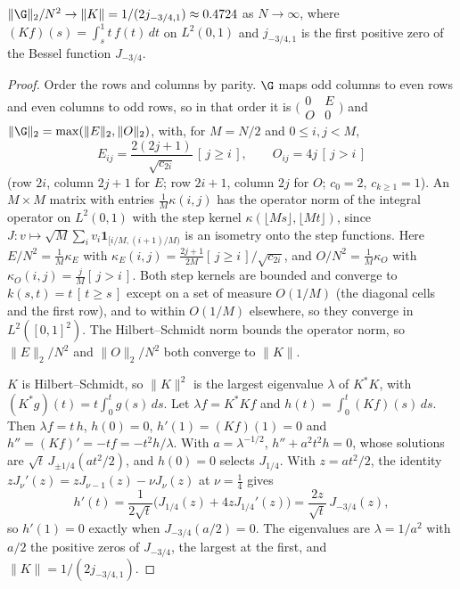 \begin{theorem}
\label{thm:G-limit}
$\|\G\|_2/N^2\to\|K\|=1/(2j_{-3/4,1})\approx0.4724$ as $N\to\infty$, where $(Kf)(s)=\int_s^1t\,f(t)\,dt$ on $L^2(0,1)$ and $j_{-3/4,1}$ is the first positive zero of the Bessel function $J_{-3/4}$.
\end{theorem}
\begin{proof}
Order the rows and columns by parity. $\G$ maps odd columns to even rows and even columns to odd rows, so in that order it is $\bigl(\begin{smallmatrix}0&E\\O&0\end{smallmatrix}\bigr)$ and $\|\G\|_2=\max(\|E\|_2,\|O\|_2)$, with, for $M=N/2$ and $0\le i,j<M$,
\begin{equation*}
    E_{ij}=\frac{2(2j+1)}{\sqrt{c_{2i}}}\,[\,j\ge i\,], \qquad O_{ij}=4j\,[\,j>i\,]
\end{equation*}
(row $2i$, column $2j+1$ for $E$; row $2i+1$, column $2j$ for $O$; $c_0=2$, $c_{k\ge1}=1$). An $M\times M$ matrix with entries $\tfrac1M\kappa(i,j)$ has the operator norm of the integral operator on $L^2(0,1)$ with the step kernel $\kappa(\lfloor Ms\rfloor,\lfloor Mt\rfloor)$, since $J:v\mapsto\sqrt M\sum_iv_i\mathbf 1_{[i/M,(i+1)/M)}$ is an isometry onto the step functions. Here $E/N^2=\tfrac1M\kappa_E$ with $\kappa_E(i,j)=\tfrac{2j+1}{2M}[\,j\ge i\,]/\sqrt{c_{2i}}$, and $O/N^2=\tfrac1M\kappa_O$ with $\kappa_O(i,j)=\tfrac jM[\,j>i\,]$. Both step kernels are bounded and converge to $k(s,t)=t\,[\,t\ge s\,]$ except on a set of measure $O(1/M)$ (the diagonal cells and the first row), and to within $O(1/M)$ elsewhere, so they converge in $L^2([0,1]^2)$. The Hilbert--Schmidt norm bounds the operator norm, so $\|E\|_2/N^2$ and $\|O\|_2/N^2$ both converge to $\|K\|$.

$K$ is Hilbert--Schmidt, so $\|K\|^2$ is the largest eigenvalue $\lambda$ of $K^*K$, with $(K^*g)(t)=t\int_0^tg(s)\,ds$. Let $\lambda f=K^*Kf$ and $h(t)=\int_0^t(Kf)(s)\,ds$. Then $\lambda f=t\,h$, $h(0)=0$, $h'(1)=(Kf)(1)=0$ and $h''=(Kf)'=-tf=-t^2h/\lambda$. With $a=\lambda^{-1/2}$, $h''+a^2t^2h=0$, whose solutions are $\sqrt t\,J_{\pm1/4}(at^2/2)$, and $h(0)=0$ selects $J_{1/4}$. With $z=at^2/2$, the identity $zJ_\nu'(z)=zJ_{\nu-1}(z)-\nu J_\nu(z)$ at $\nu=\tfrac14$ gives
\begin{equation*}
    h'(t)=\frac{1}{2\sqrt t}\bigl(J_{1/4}(z)+4zJ_{1/4}'(z)\bigr)=\frac{2z}{\sqrt t}\,J_{-3/4}(z),
\end{equation*}
so $h'(1)=0$ exactly when $J_{-3/4}(a/2)=0$. The eigenvalues are $\lambda=1/a^2$ with $a/2$ the positive zeros of $J_{-3/4}$, the largest at the first, and $\|K\|=1/(2j_{-3/4,1})$.
\end{proof}

